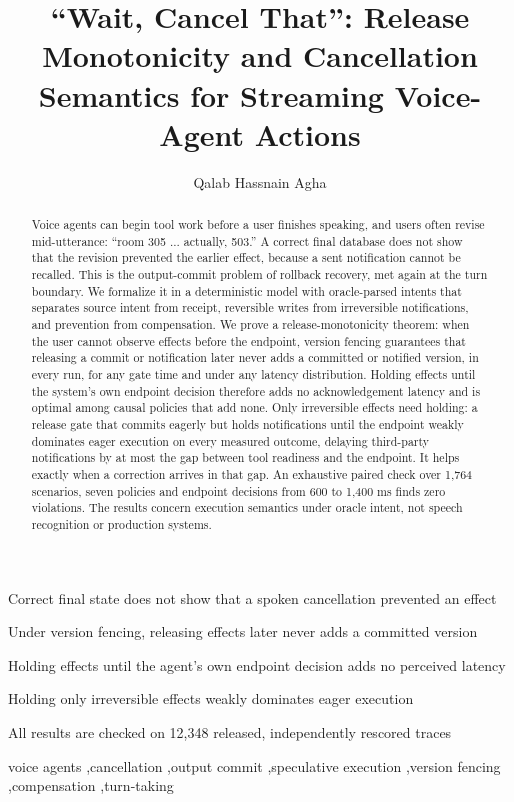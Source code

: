 \documentclass[review,12pt]{elsarticle}
\begin{document}
\begin{frontmatter}
\title{``Wait, Cancel That'': Release Monotonicity and Cancellation Semantics for Streaming Voice-Agent Actions}
\author[qg]{Qalab Hassnain Agha}
\begin{abstract}
Voice agents can begin tool work before a user finishes speaking, and users often revise mid-utterance: ``room 305 ... actually, 503.'' A correct final database does not show that the revision prevented the earlier effect, because a sent notification cannot be recalled. This is the output-commit problem of rollback recovery, met again at the turn boundary. We formalize it in a deterministic model with oracle-parsed intents that separates source intent from receipt, reversible writes from irreversible notifications, and prevention from compensation. We prove a release-monotonicity theorem: when the user cannot observe effects before the endpoint, version fencing guarantees that releasing a commit or notification later never adds a committed or notified version, in every run, for any gate time and under any latency distribution. Holding effects until the system's own endpoint decision therefore adds no acknowledgement latency and is optimal among causal policies that add none. Only irreversible effects need holding: a release gate that commits eagerly but holds notifications until the endpoint weakly dominates eager execution on every measured outcome, delaying third-party notifications by at most the gap between tool readiness and the endpoint. It helps exactly when a correction arrives in that gap. An exhaustive paired check over 1,764 scenarios, seven policies and endpoint decisions from 600 to 1,400 ms finds zero violations. The results concern execution semantics under oracle intent, not speech recognition or production systems.
\end{abstract}
\begin{highlights}
\item Correct final state does not show that a spoken cancellation prevented an effect
\item Under version fencing, releasing effects later never adds a committed version
\item Holding effects until the agent's own endpoint decision adds no perceived latency
\item Holding only irreversible effects weakly dominates eager execution
\item All results are checked on 12,348 released, independently rescored traces
\end{highlights}
\begin{keyword}
voice agents \sep cancellation \sep output commit \sep speculative execution \sep version fencing \sep compensation \sep turn-taking
\end{keyword}
\end{frontmatter}
\linenumbers
\sloppy
\end{document}
